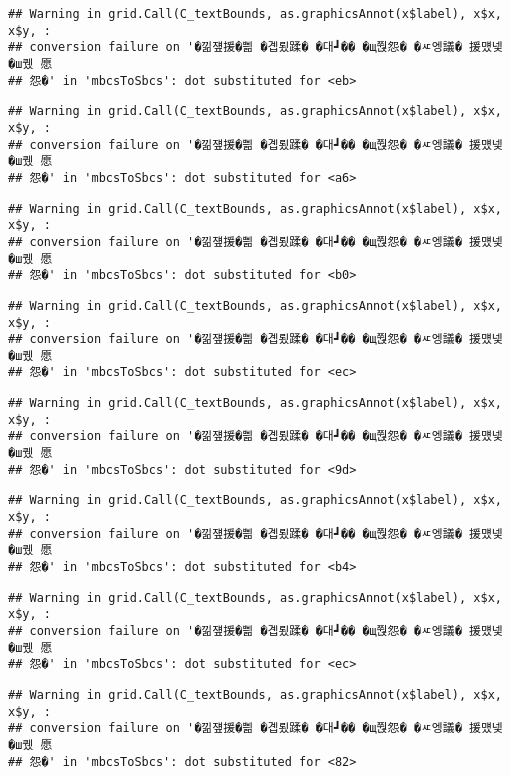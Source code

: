 \documentclass[
]{article}
\begin{document}
\begin{verbatim}
## Warning in grid.Call(C_textBounds, as.graphicsAnnot(x$label), x$x, x$y, :
## conversion failure on '�낆쟾援�쁾 �곕룄蹂� �대┛�� �щ쭩怨� �ㅼ엥議� 援먰넻�ш퀬 愿
## 怨�' in 'mbcsToSbcs': dot substituted for <eb>
\end{verbatim}

\begin{verbatim}
## Warning in grid.Call(C_textBounds, as.graphicsAnnot(x$label), x$x, x$y, :
## conversion failure on '�낆쟾援�쁾 �곕룄蹂� �대┛�� �щ쭩怨� �ㅼ엥議� 援먰넻�ш퀬 愿
## 怨�' in 'mbcsToSbcs': dot substituted for <a6>
\end{verbatim}

\begin{verbatim}
## Warning in grid.Call(C_textBounds, as.graphicsAnnot(x$label), x$x, x$y, :
## conversion failure on '�낆쟾援�쁾 �곕룄蹂� �대┛�� �щ쭩怨� �ㅼ엥議� 援먰넻�ш퀬 愿
## 怨�' in 'mbcsToSbcs': dot substituted for <b0>
\end{verbatim}

\begin{verbatim}
## Warning in grid.Call(C_textBounds, as.graphicsAnnot(x$label), x$x, x$y, :
## conversion failure on '�낆쟾援�쁾 �곕룄蹂� �대┛�� �щ쭩怨� �ㅼ엥議� 援먰넻�ш퀬 愿
## 怨�' in 'mbcsToSbcs': dot substituted for <ec>
\end{verbatim}

\begin{verbatim}
## Warning in grid.Call(C_textBounds, as.graphicsAnnot(x$label), x$x, x$y, :
## conversion failure on '�낆쟾援�쁾 �곕룄蹂� �대┛�� �щ쭩怨� �ㅼ엥議� 援먰넻�ш퀬 愿
## 怨�' in 'mbcsToSbcs': dot substituted for <9d>
\end{verbatim}

\begin{verbatim}
## Warning in grid.Call(C_textBounds, as.graphicsAnnot(x$label), x$x, x$y, :
## conversion failure on '�낆쟾援�쁾 �곕룄蹂� �대┛�� �щ쭩怨� �ㅼ엥議� 援먰넻�ш퀬 愿
## 怨�' in 'mbcsToSbcs': dot substituted for <b4>
\end{verbatim}

\begin{verbatim}
## Warning in grid.Call(C_textBounds, as.graphicsAnnot(x$label), x$x, x$y, :
## conversion failure on '�낆쟾援�쁾 �곕룄蹂� �대┛�� �щ쭩怨� �ㅼ엥議� 援먰넻�ш퀬 愿
## 怨�' in 'mbcsToSbcs': dot substituted for <ec>
\end{verbatim}

\begin{verbatim}
## Warning in grid.Call(C_textBounds, as.graphicsAnnot(x$label), x$x, x$y, :
## conversion failure on '�낆쟾援�쁾 �곕룄蹂� �대┛�� �щ쭩怨� �ㅼ엥議� 援먰넻�ш퀬 愿
## 怨�' in 'mbcsToSbcs': dot substituted for <82>
\end{verbatim}
\end{document}
